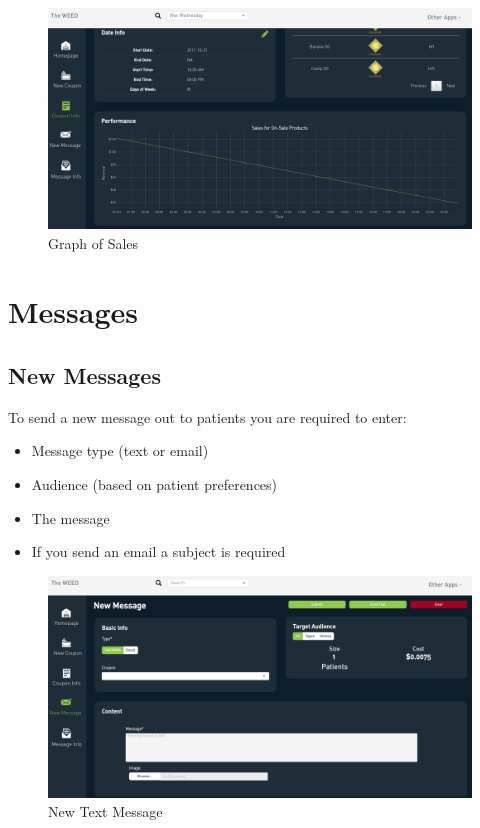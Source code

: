 \documentclass[]{book}
\theoremstyle{definition}
\theoremstyle{definition}
\theoremstyle{definition}
\theoremstyle{remark}
\begin{document}
\begin{figure}
\centering
\includegraphics{images/C5.png}
\caption{Graph of Sales}
\end{figure}

\section{Messages}\label{messages}

\subsection{New Messages}\label{new-messages}

To send a new message out to patients you are required to enter:

\begin{itemize}
\item
  Message type (text or email)
\item
  Audience (based on patient preferences)
\item
  The message
\item
  If you send an email a subject is required
\end{itemize}

\begin{figure}
\centering
\includegraphics{images/C6.png}
\caption{New Text Message}
\end{figure}
\end{document}
